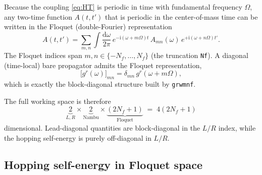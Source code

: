 \documentclass[11pt,a4paper]{article}
\newcommand{\dd}{\mathrm{d}}
\newcommand{\ii}{\mathrm{i}}
\begin{document}
Because the coupling \eqref{eq:HT} is periodic in time with fundamental
frequency $\Omega$, any two-time function $A(t,t')$ that is periodic in the
center-of-mass time can be written in the Floquet (double-Fourier)
representation
\begin{equation}
  A(t,t') = \sum_{m,n}\int\frac{\dd\omega}{2\pi}\,
            e^{-\ii(\omega+m\Omega)t}\,A_{mn}(\omega)\,e^{+\ii(\omega+n\Omega)t'}.
\end{equation}
The Floquet indices span $m,n\in\{-N_f,\dots,N_f\}$ (the truncation \texttt{Nf}).  
A diagonal (time-local) bare propagator admits the Floquet representation,
\begin{equation}
  \bigl[g^r(\omega)\bigr]_{mn} = \delta_{mn}\,g^r(\omega+m\Omega),
  \label{eq:floquet_bare}
\end{equation}
which is exactly the block-diagonal structure built by \texttt{grwmnf}.

The full working space is therefore
\begin{equation}
  \underbrace{2}_{L,R}\times
  \underbrace{2}_{\text{Nambu}}\times
  \underbrace{(2N_f+1)}_{\text{Floquet}}
  \;=\; 4(2N_f+1)
\end{equation}
dimensional.  Lead-diagonal quantities are block-diagonal in the $L/R$ index,
while the hopping self-energy is purely off-diagonal in $L/R$.

\subsection{Hopping self-energy in Floquet space}
\label{sec:hop}
\end{document}
